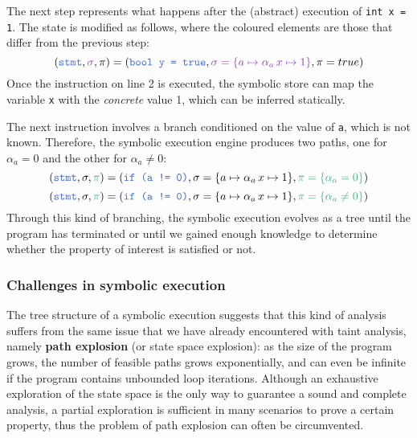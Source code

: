 \documentclass[target=mst,aauheader=aics]{thud}
\theoremstyle{definition}
\begin{document}
	The next step represents what happens after the (abstract) execution of \texttt{int x = 1}. The state is modified as follows, where the coloured elements are those that differ from the previous step:
	\[
	(\textcolor{blue}{\texttt{stmt}}, \textcolor{violet}{\sigma}, \pi) = (\textcolor{blue}{\texttt{bool y = true}}, \textcolor{violet}{\sigma = \{a \mapsto \alpha_a\, x \mapsto 1\}}, \pi = true)
	\] 
	Once the instruction on line 2 is executed, the symbolic store can map the variable \texttt{x} with the \textit{concrete} value 1, which can be inferred statically.
	
	The next instruction involves a branch conditioned on the value of \texttt{a}, which is not known. Therefore, the symbolic execution engine produces two paths, one for $\alpha_a = 0$ and the other for $\alpha_a \neq 0$:
	\[
	(\textcolor{blue}{\texttt{stmt}}, \sigma, \textcolor{green}{\pi}) = (\textcolor{blue}{\texttt{if (a != 0)}}, \sigma = \{a \mapsto \alpha_a\, x \mapsto 1\}, \textcolor{green}{\pi = \{\alpha_a = 0\}})
	\]
	\[
	(\textcolor{blue}{\texttt{stmt}}, \sigma, \textcolor{green}{\pi}) = (\textcolor{blue}{\texttt{if (a != 0)}}, \sigma = \{a \mapsto \alpha_a\, x \mapsto 1\}, \textcolor{green}{\pi = \{\alpha_a \neq 0\}})
	\]
	Through this kind of branching, the symbolic execution evolves as a tree until the program has terminated or until we gained enough knowledge to determine whether the property of interest is satisfied or not.
	\subsubsection{Challenges in symbolic execution}
	The tree structure of a symbolic execution suggests that this kind of analysis suffers from the same issue that we have already encountered with taint analysis, namely \textbf{path explosion} (or state space explosion): as the size of the program grows, the number of feasible paths grows exponentially, and can even be infinite if the program contains unbounded loop iterations. Although an exhaustive exploration of the state space is the only way to guarantee a sound and complete analysis, a partial exploration is sufficient in many scenarios to prove a certain property, thus the problem of path explosion can often be circumvented.
	
\end{document}
